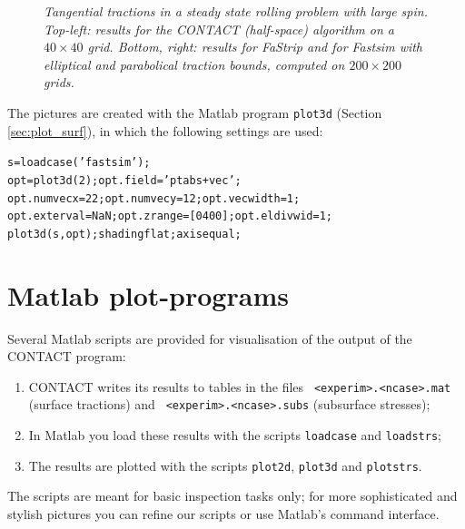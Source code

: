 \documentclass[12pt]{report}
\begin{document}
\begin{figure}[bt]
\centering
{}

\caption{\em Tangential tractions in a steady state rolling problem with
        large spin. Top-left: results for the CONTACT (half-space)
        algorithm on a $40\times 40$ grid. Bottom, right: results for
        FaStrip and for Fastsim with elliptical and parabolical traction
        bounds, computed on $200\times 200$ grids.}
\label{fig:eldiv_fastsim}
\end{figure}

The pictures are created with the Matlab program {\tt plot3d} (Section
\ref{sec:plot_surf}), in which the following settings are used:
\begin{alltt}\small
s = loadcase('fastsim'); 
opt = plot3d(2); opt.field='ptabs+vec'; 
opt.numvecx=22; opt.numvecy=12; opt.vecwidth=1;
opt.exterval=NaN; opt.zrange=[0 400]; opt.eldivwid=1;
plot3d(s, opt); shading flat; axis equal;
\end{alltt}


\chapter{Matlab plot-programs}
\label{chp:matlab_plots}

Several Matlab scripts are provided for visualisation of the output of the
CONTACT program:
\begin{enumerate}
\item CONTACT writes its results to tables in the files {\tt
        <experim>.<ncase>.mat} (surface tractions) and {\tt
        <experim>.<ncase>.subs} (subsurface stresses);
\item In Matlab you load these results with the scripts {\tt loadcase} and
        {\tt loadstrs};
\item The results are plotted with the scripts {\tt plot2d}, {\tt plot3d}
        and {\tt plotstrs}.
\end{enumerate}
The scripts are meant for basic inspection tasks only; for more
sophisticated and stylish pictures you can refine our scripts or use
Matlab's command interface.
\end{document}
